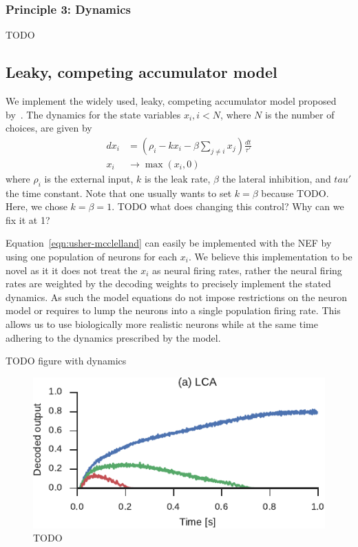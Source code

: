 \documentclass[10pt,letterpaper]{article}
\begin{document}
\subsubsection{Principle 3: Dynamics}
TODO

\subsection{Leaky, competing accumulator model}
We implement the widely used, leaky, competing accumulator model proposed 
by~.  The dynamics for the state variables $x_i, i < N$, where 
$N$ is the number of choices, are given by
\begin{equation}\label{eqn:usher-mcclelland}
    \begin{split}
    dx_i &= \left(\rho_i - kx_i - \beta \sum_{j \neq i} x_j\right) 
    \frac{dt}{\tau'} \\
    x_i &\rightarrow \max(x_i, 0)
    \end{split}
\end{equation}
where $\rho_i$ is the external input, $k$ is the leak rate, $\beta$ the lateral 
inhibition, and $tau'$ the time constant. Note that one usually wants to set $k 
= \beta$ because TODO\@. Here, we chose $k = \beta = 1$. TODO what does changing 
this control? Why can we fix it at 1?

Equation~\ref{eqn:usher-mcclelland} can easily be implemented with the NEF by 
using one population of neurons for each $x_i$.  We believe this implementation 
to be novel as it it does not treat the $x_i$ as neural firing rates, rather the 
neural firing rates are weighted by the decoding weights to precisely implement 
the stated dynamics. As such the model equations do not impose restrictions on 
the neuron model or requires to lump the neurons into a single population firing 
rate. This allows us to use biologically more realistic neurons while at the 
same time adhering to the dynamics prescribed by the model.

TODO figure with dynamics
\begin{figure}
    \centering
    \includegraphics{figures/usher-mcclelland}
    \caption{TODO}\label{fig:usher-mcclelland}
\end{figure}
\end{document}
